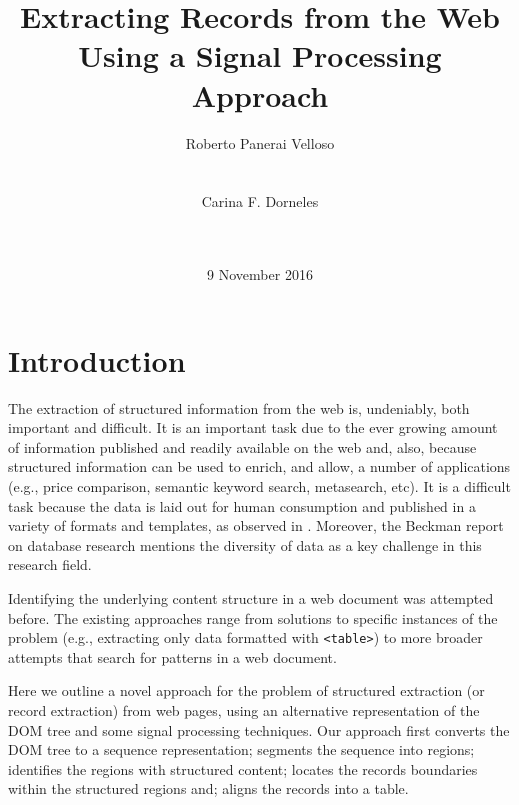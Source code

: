 \documentclass{vldb}
\title{Extracting Records from the Web Using a Signal Processing Approach}
\author{
\alignauthor
Roberto Panerai Velloso\\
       \affaddr{Universidade Federal de Santa Catarina}\\
       \affaddr{Florianópolis (SC), Brazil}\\
       \email{rvelloso@gmail.com}
\alignauthor
Carina F. Dorneles\\
       \affaddr{Universidade Federal de Santa Catarina}\\
       \affaddr{Florianópolis (SC), Brazil}\\
       \email{dorneles@inf.ufsc.br}
}
\date{9 November 2016}
\begin{document}

\maketitle

\section{Introduction}

The extraction of structured information from the web is, undeniably, both
important and difficult. It is an important task due to the ever growing amount
of information published and readily available on the web and, also, because
structured information can be used to enrich, and allow, a number of
applications (e.g., price comparison, semantic keyword search, metasearch, etc).
It is a difficult task because the data is laid out for human consumption and
published in a variety of formats and templates, as observed in
\cite{structured2011}. Moreover, the Beckman report on database
research\cite{abadi2014beckman} mentions the diversity of data as a key
challenge in this research field.

Identifying the underlying content structure in a web document was attempted
before. The existing approaches range from solutions to specific instances of
the problem (e.g., extracting only data formatted with
\texttt{<table>}\cite{webtables2008}) to more broader attempts that search for
patterns in a web document\cite{MDR03}.

Here we outline a novel approach for the problem of structured extraction (or
record extraction) from web pages, using an alternative representation of the
DOM tree and some signal processing techniques. Our approach first converts the
DOM tree to a sequence representation; segments the sequence into regions;
identifies the regions with structured content; locates the records boundaries
within the structured regions and; aligns the records into a table.
\end{document}
